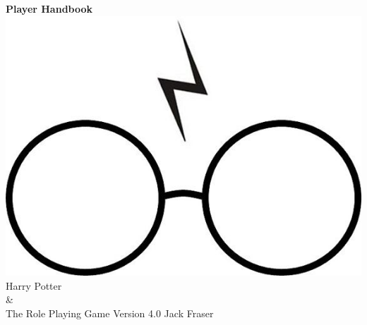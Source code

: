 \documentclass[oneside, twocolumn]{book}
\begin{document}
\begin{titlepage}
    \centering
    \vfill
    {\bfseries
        {\HP \fontsize{40}{35}\selectfont Player Handbook}
    }    
    \vfill
    \includegraphics[scale = 0.7]{../Images/glasses} %
    \vfill
    {\HP \fontsize{30}{24} \selectfont  Harry Potter \\\&\\ The Role Playing Game}
    \normalsize
    \vfill
    {\HP \fontsize{22}{0} \selectfont Version 4.0 \hfill Jack Fraser}
\end{titlepage}

\footnotesize
\tableofcontents
\normalsize



















\end{document}
